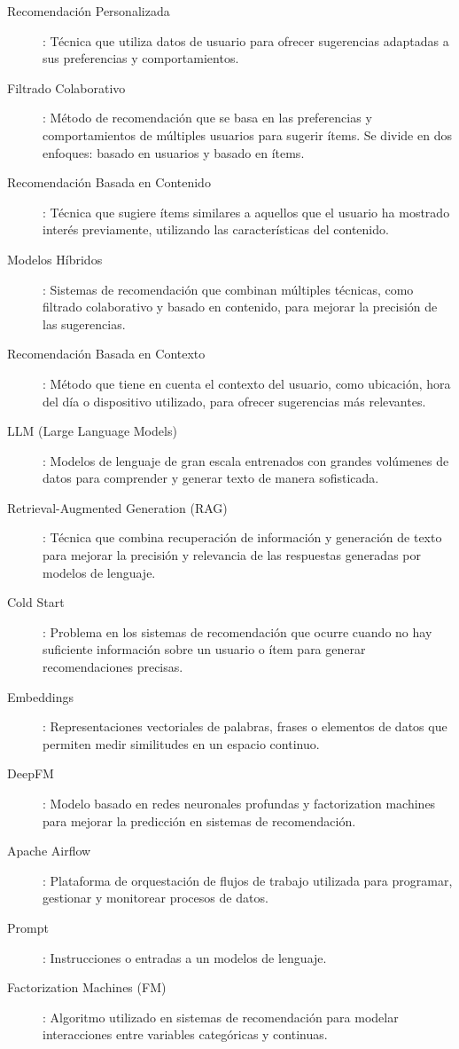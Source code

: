 \documentclass[11pt,a4paper,twoside]{thesis}
\begin{document}
\begin{description}
	\item[Recomendación Personalizada]: Técnica que utiliza datos de usuario para ofrecer sugerencias adaptadas a sus preferencias y comportamientos.
	\item[Filtrado Colaborativo]: Método de recomendación que se basa en las preferencias y comportamientos de múltiples usuarios para sugerir ítems. Se divide en dos enfoques: basado en usuarios y basado en ítems.
	\item[Recomendación Basada en Contenido]: Técnica que sugiere ítems similares a aquellos que el usuario ha mostrado interés previamente, utilizando las características del contenido.
	\item[Modelos Híbridos]: Sistemas de recomendación que combinan múltiples técnicas, como filtrado colaborativo y basado en contenido, para mejorar la precisión de las sugerencias.
	\item[Recomendación Basada en Contexto]: Método que tiene en cuenta el contexto del usuario, como ubicación, hora del día o dispositivo utilizado, para ofrecer sugerencias más relevantes.
	\item[LLM (Large Language Models)]: Modelos de lenguaje de gran escala entrenados con grandes volúmenes de datos para comprender y generar texto de manera sofisticada.
	\item[Retrieval-Augmented Generation (RAG)]: Técnica que combina recuperación de información y generación de texto para mejorar la precisión y relevancia de las respuestas generadas por modelos de lenguaje.
	\item[Cold Start]: Problema en los sistemas de recomendación que ocurre cuando no hay suficiente información sobre un usuario o ítem para generar recomendaciones precisas.
	\item[Embeddings]: Representaciones vectoriales de palabras, frases o elementos de datos que permiten medir similitudes en un espacio continuo.
	\item[DeepFM]: Modelo basado en redes neuronales profundas y factorization machines para mejorar la predicción en sistemas de recomendación.
	\item[Apache Airflow]: Plataforma de orquestación de flujos de trabajo utilizada para programar, gestionar y monitorear procesos de datos.
	\item[Prompt]: Instrucciones o entradas a un modelos de lenguaje.
	\item[Factorization Machines (FM)]: Algoritmo utilizado en sistemas de recomendación para modelar interacciones entre variables categóricas y continuas.

\end{description}
\end{document}
